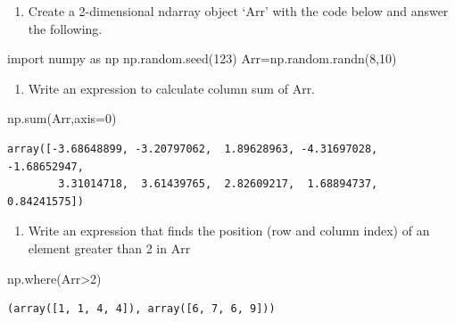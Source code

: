 \documentclass[
  a4paper,
  DIV=11,
  numbers=noendperiod]{scrreprt}
\newenvironment{Shaded}{\begin{snugshade}}{\end{snugshade}}
\newcommand{\BuiltInTok}[1]{\textcolor[rgb]{0.00,0.23,0.31}{#1}}
\newcommand{\DecValTok}[1]{\textcolor[rgb]{0.68,0.00,0.00}{#1}}
\newcommand{\ImportTok}[1]{\textcolor[rgb]{0.00,0.46,0.62}{#1}}
\newcommand{\NormalTok}[1]{\textcolor[rgb]{0.00,0.23,0.31}{#1}}
\newcommand{\OperatorTok}[1]{\textcolor[rgb]{0.37,0.37,0.37}{#1}}
\providecommand{\tightlist}{%
  \setlength{\itemsep}{0pt}\setlength{\parskip}{0pt}}\usepackage{longtable,booktabs,array}
\begin{document}

\begin{enumerate}
\def\labelenumi{\arabic{enumi}.}
\tightlist
\item
  Create a 2-dimensional ndarray object `Arr' with the code below and
  answer the following.
\end{enumerate}

\begin{Shaded}
\begin{Highlighting}[]
\ImportTok{import}\NormalTok{ numpy }\ImportTok{as}\NormalTok{ np}
\NormalTok{np.random.seed(}\DecValTok{123}\NormalTok{)}
\NormalTok{Arr}\OperatorTok{=}\NormalTok{np.random.randn(}\DecValTok{8}\NormalTok{,}\DecValTok{10}\NormalTok{)}
\end{Highlighting}
\end{Shaded}

\begin{enumerate}
\def\labelenumi{(\arabic{enumi})}
\tightlist
\item
  Write an expression to calculate column sum of Arr.
\end{enumerate}

\begin{Shaded}
\begin{Highlighting}[]
\NormalTok{np.}\BuiltInTok{sum}\NormalTok{(Arr,axis}\OperatorTok{=}\DecValTok{0}\NormalTok{)}
\end{Highlighting}
\end{Shaded}

\begin{verbatim}
array([-3.68648899, -3.20797062,  1.89628963, -4.31697028, -1.68652947,
        3.31014718,  3.61439765,  2.82609217,  1.68894737,  0.84241575])
\end{verbatim}

\begin{enumerate}
\def\labelenumi{(\arabic{enumi})}
\setcounter{enumi}{1}
\tightlist
\item
  Write an expression that finds the position (row and column index) of
  an element greater than 2 in Arr
\end{enumerate}

\begin{Shaded}
\begin{Highlighting}[]
\NormalTok{np.where(Arr}\OperatorTok{\textgreater{}}\DecValTok{2}\NormalTok{)}
\end{Highlighting}
\end{Shaded}

\begin{verbatim}
(array([1, 1, 4, 4]), array([6, 7, 6, 9]))
\end{verbatim}
\end{document}

